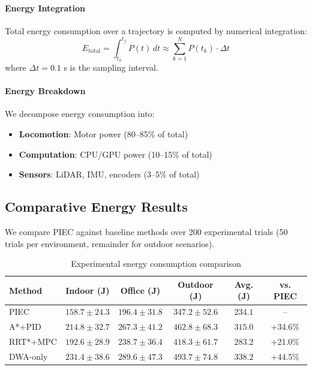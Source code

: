 \paragraph{Energy Integration}
Total energy consumption over a trajectory is computed by numerical integration:
\begin{equation}
E_{\text{total}} = \int_{t_0}^{t_f} P(t) \, dt \approx \sum_{k=1}^{N} P(t_k) \cdot \Delta t
\end{equation}
where $\Delta t = 0.1$ s is the sampling interval.

\paragraph{Energy Breakdown}
We decompose energy consumption into:
\begin{itemize}
    \item \textbf{Locomotion}: Motor power (80--85\% of total)
    \item \textbf{Computation}: CPU/GPU power (10--15\% of total)
    \item \textbf{Sensors}: LiDAR, IMU, encoders (3--5\% of total)
\end{itemize}

\subsection{Comparative Energy Results}

We compare PIEC against baseline methods over 200 experimental trials (50 trials per environment, remainder for outdoor scenarios).

\begin{table}[htbp]
\centering
\caption{Experimental energy consumption comparison}
\label{tab:exp_energy_comparison}
\begin{tabular}{lccccc}
\toprule
\textbf{Method} & \textbf{Indoor (J)} & \textbf{Office (J)} & \textbf{Outdoor (J)} & \textbf{Avg. (J)} & \textbf{vs. PIEC} \\
\midrule
PIEC & $\mathbf{158.7 \pm 24.3}$ & $\mathbf{196.4 \pm 31.8}$ & $\mathbf{347.2 \pm 52.6}$ & $\mathbf{234.1}$ & -- \\
A*+PID & $214.8 \pm 32.7$ & $267.3 \pm 41.2$ & $462.8 \pm 68.3$ & $315.0$ & +34.6\% \\
RRT*+MPC & $192.6 \pm 28.9$ & $238.7 \pm 36.4$ & $418.3 \pm 61.7$ & $283.2$ & +21.0\% \\
DWA-only & $231.4 \pm 38.6$ & $289.6 \pm 47.3$ & $493.7 \pm 74.8$ & $338.2$ & +44.5\% \\
\bottomrule
\end{tabular}
\end{table}

